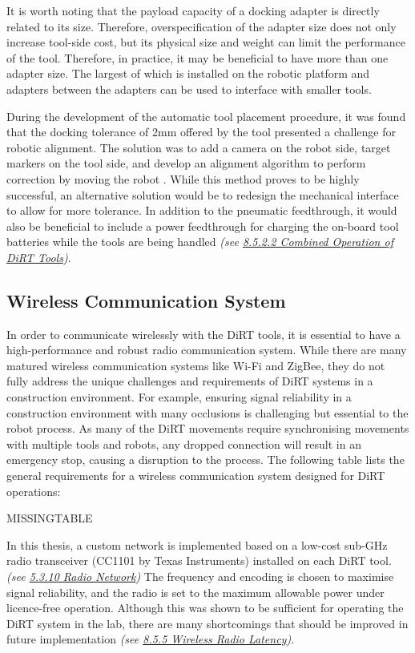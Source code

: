 It is worth noting that the payload capacity of a docking adapter is directly related to its size. Therefore, overspecification of the adapter size does not only increase tool-side cost, but its physical size and weight can limit the performance of the tool. Therefore, in practice, it may be beneficial to have more than one adapter size. The largest of which is installed on the robotic platform and adapters between the adapters can be used to interface with smaller tools.

During the development of the automatic tool placement procedure, it was found that the docking tolerance of 2mm offered by the tool presented a challenge for robotic alignment. The solution was to add a camera on the robot side, target markers on the tool side, and develop an alignment algorithm to perform correction by moving the robot . While this method proves to be highly successful, an alternative solution would be to redesign the mechanical interface to allow for more tolerance. In addition to the pneumatic feedthrough, it would also be beneficial to include a power feedthrough for charging the on-board tool batteries while the tools are being handled \textit{(see \ul{8.5.2.2 Combined Operation of DiRT Tools})}. 

\subsection{Wireless Communication System}
\label{subsection:discussion-wireless-communication-system}

In order to communicate wirelessly with the DiRT tools, it is essential to have a high-performance and robust radio communication system. While there are many matured wireless communication systems like Wi-Fi and ZigBee, they do not fully address the unique challenges and requirements of DiRT systems in a construction environment. For example, ensuring signal reliability in a construction environment with many occlusions is challenging but essential to the robot process. As many of the DiRT movements require synchronising movements with multiple tools and robots, any dropped connection will result in an emergency stop, causing a disruption to the process. The following table lists the general requirements for a wireless communication system designed for DiRT operations:

MISSINGTABLE

In this thesis, a custom network is implemented based on a low-cost sub-GHz radio transceiver (CC1101 by Texas Instruments) installed on each DiRT tool. \textit{(see \ul{5.3.10 Radio Network}) }The frequency and encoding is chosen to maximise signal reliability, and the radio is set to the maximum allowable power under licence-free operation. Although this was shown to be sufficient for operating the DiRT system in the lab, there are many shortcomings that should be improved in future implementation \textit{(see \ul{8.5.5 Wireless Radio Latency})}.

